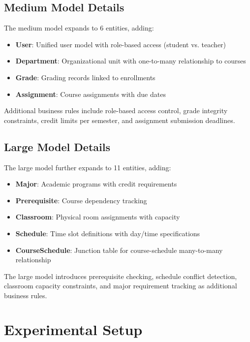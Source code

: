 \documentclass[11pt,a4paper]{article}
\begin{document}
\subsection{Medium Model Details}

The medium model expands to 6 entities, adding:

\begin{itemize}
    \item \textbf{User}: Unified user model with role-based access (student vs. teacher)
    \item \textbf{Department}: Organizational unit with one-to-many relationship to courses
    \item \textbf{Grade}: Grading records linked to enrollments
    \item \textbf{Assignment}: Course assignments with due dates
\end{itemize}

Additional business rules include role-based access control, grade integrity constraints, credit limits per semester, and assignment submission deadlines.

\subsection{Large Model Details}

The large model further expands to 11 entities, adding:

\begin{itemize}
    \item \textbf{Major}: Academic programs with credit requirements
    \item \textbf{Prerequisite}: Course dependency tracking
    \item \textbf{Classroom}: Physical room assignments with capacity
    \item \textbf{Schedule}: Time slot definitions with day/time specifications
    \item \textbf{CourseSchedule}: Junction table for course-schedule many-to-many relationship
\end{itemize}

The large model introduces prerequisite checking, schedule conflict detection, classroom capacity constraints, and major requirement tracking as additional business rules.

\newpage
\section{Experimental Setup}
\label{sec:experiments}
\end{document}
